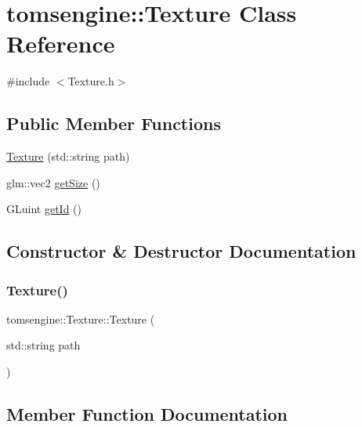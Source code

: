 \hypertarget{classtomsengine_1_1_texture}{}\section{tomsengine\+:\+:Texture Class Reference}
\label{classtomsengine_1_1_texture}


{\ttfamily \#include $<$Texture.\+h$>$}

\subsection*{Public Member Functions}
\begin{DoxyCompactItemize}
\item 
\mbox{\hyperlink{classtomsengine_1_1_texture_a0afe8db9c4f2d4ffc55430f1ed92e053}{Texture}} (std\+::string path)
\item 
glm\+::vec2 \mbox{\hyperlink{classtomsengine_1_1_texture_a270a5d664501ca0e7843a737508dbba5}{get\+Size}} ()
\item 
G\+Luint \mbox{\hyperlink{classtomsengine_1_1_texture_a9224651f86e573dd31436d919258dc03}{get\+Id}} ()
\end{DoxyCompactItemize}


\subsection{Constructor \& Destructor Documentation}
\mbox{\label{classtomsengine_1_1_texture_a0afe8db9c4f2d4ffc55430f1ed92e053}} 
\subsubsection{\texorpdfstring{Texture()}{Texture()}}
{\footnotesize\ttfamily tomsengine\+::\+Texture\+::\+Texture (\begin{DoxyParamCaption}\item[{std\+::string}]{path }\end{DoxyParamCaption})}



\subsection{Member Function Documentation}
\mbox{\label{classtomsengine_1_1_texture_a9224651f86e573dd31436d919258dc03}} 
